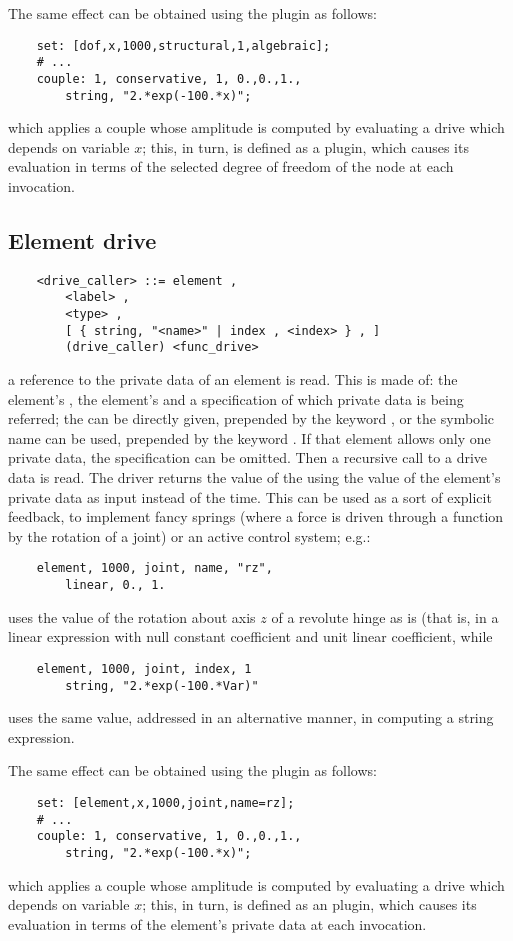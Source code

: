 \noindent
The same effect can be obtained using the  plugin as follows:
\begin{verbatim}
    set: [dof,x,1000,structural,1,algebraic];
    # ...
    couple: 1, conservative, 1, 0.,0.,1.,
        string, "2.*exp(-100.*x)";
\end{verbatim}
which applies a couple whose amplitude is computed by evaluating
a  drive which depends on variable $x$; this, in turn,
is defined as a  plugin, which causes its evaluation
in terms of the selected degree of freedom of the node at each invocation.


\subsection{Element drive}\label{sec:DRIVE-ELEMENT}
\begin{verbatim}
    <drive_caller> ::= element ,
        <label> ,
        <type> ,
        [ { string, "<name>" | index , <index> } , ]
        (drive_caller) <func_drive>
\end{verbatim}
a reference to the private data of an element is read.
This is made of: the element's , the element's 
and a specification of which private data is being referred;
the  can be directly given, prepended by the keyword
, or the symbolic name can be used, prepended by 
the keyword .
If that element allows only one private data, the specification 
can be omitted.
Then a recursive call to a drive data is read. 
The driver returns the value of the  
 using the value of the 
element's private data as input instead of the time. 
This can be used as a sort of explicit feedback, to implement fancy
springs (where a force is driven through a function by the rotation
of a joint) or an active control system; e.g.:
\begin{verbatim}
    element, 1000, joint, name, "rz",
        linear, 0., 1.
\end{verbatim}
uses the value of the rotation about axis $z$ of a revolute hinge
as is (that is, in a linear expression with null constant coefficient 
and unit linear coefficient, while
\begin{verbatim}
    element, 1000, joint, index, 1
        string, "2.*exp(-100.*Var)"
\end{verbatim}
uses the same value, addressed in an alternative manner, in computing
a string expression.

\noindent
The same effect can be obtained using the  plugin as follows:
\begin{verbatim}
    set: [element,x,1000,joint,name=rz];
    # ...
    couple: 1, conservative, 1, 0.,0.,1.,
        string, "2.*exp(-100.*x)";
\end{verbatim}
which applies a couple whose amplitude is computed by evaluating
a  drive which depends on variable $x$; this, in turn,
is defined as an  plugin, which causes its evaluation
in terms of the element's private data at each invocation.

